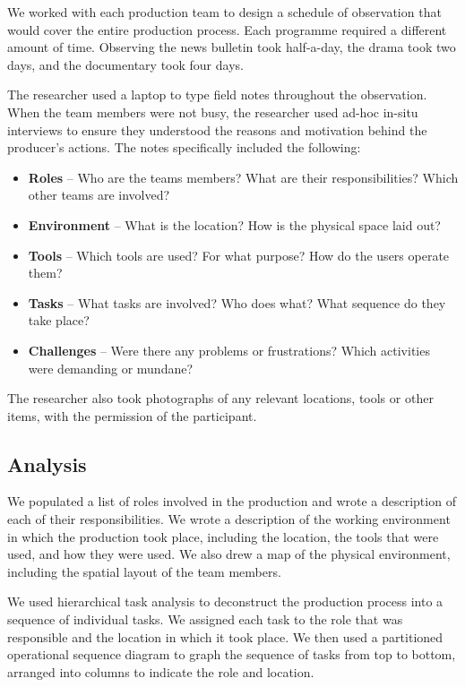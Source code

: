 We worked with each production team to design a schedule of observation that would cover the entire production process.
Each programme required a different amount of time. Observing the news bulletin took half-a-day, the drama took two
days, and the documentary took four days. 

The researcher used a laptop to type field notes throughout the observation. When the team members were not busy, the
researcher used ad-hoc in-situ interviews to ensure they understood the reasons and motivation behind the producer's
actions. The notes specifically included the following:

{\singlespacing
\begin{itemize}
	\item \textbf{Roles} -- Who are the teams members? What are their responsibilities? Which other teams are involved?
	\item \textbf{Environment} -- What is the location? How is the physical space laid out?
	\item \textbf{Tools} -- Which tools are used? For what purpose? How do the users operate them?
	\item \textbf{Tasks} -- What tasks are involved? Who does what? What sequence do they take place?
	\item \textbf{Challenges} -- Were there any problems or frustrations? Which activities were demanding or mundane?
\end{itemize}
}

The researcher also took photographs of any relevant locations, tools or other items, with the permission of the
participant.

\subsection{Analysis}

We populated a list of roles involved in the production and wrote a description of each of their responsibilities. We
wrote a description of the working environment in which the production took place, including the location, the tools
that were used, and how they were used. We also drew a map of the physical environment, including the spatial layout of
the team members.

We used hierarchical task analysis \citep{Kirwan1992,Annett2000} to deconstruct the production process into a sequence
of individual tasks. We assigned each task to the role that was responsible and the location in which it took
place. We then used a partitioned operational sequence diagram \citep{Kirwan1992} to graph the sequence of tasks from
top to bottom, arranged into columns to indicate the role and location.

